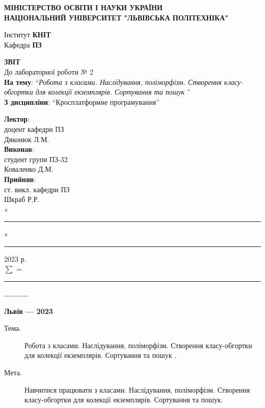 \documentclass[14pt]{extreport}
\newcommand\subject{Кросплатформне програмування}
\newcommand\lecturer{доцент кафедри ПЗ\\Дяконюк Л.М.}
\newcommand\teacher{ст. викл. кафедри ПЗ\\Шкраб Р.Р.}
\newcommand\mygroup{ПЗ-32}
\newcommand\lab{2}
\newcommand\theme{Робота з класами. Наслідування,
	поліморфізм. Створення класу-обгортки для
	колекції екземплярів. Сортування та пошук
}
\newcommand\purpose{Навчитися працювати з класами. Наслідування,
	поліморфізм. Створення класу-обгортки для
	колекції екземплярів. Сортування та пошук}
\begin{document}
\begin{normalsize}
	\begin{titlepage}
		\thispagestyle{empty}
		\begin{center}
			\textbf{МІНІСТЕРСТВО ОСВІТИ І НАУКИ УКРАЇНИ\\
				НАЦІОНАЛЬНИЙ УНІВЕРСИТЕТ "ЛЬВІВСЬКА ПОЛІТЕХНІКА"}
		\end{center}
		\begin{flushright}
			Інститут \textbf{КНІТ}\\
			Кафедра \textbf{ПЗ}
		\end{flushright}
		\vspace{160pt}
		\begin{center}
			\textbf{ЗВІТ}\\
			\vspace{10pt}
			До лабораторної роботи № \lab\\
			\textbf{На тему}: “\textit{\theme}”\\
			\textbf{З дисципліни}: “\subject”
		\end{center}
		\vspace{40pt}
		\begin{flushright}
			
			\textbf{Лектор}:\\
			\lecturer\\
			\vspace{10pt}
			\textbf{Виконав}:\\
			
			студент групи \mygroup\\
			Коваленко Д.М.\\
			\vspace{10pt}
			\textbf{Прийняв}:\\
			
			\teacher\\
			
			\vspace{28pt}
			«\rule{1cm}{0.15mm}» \rule{1.5cm}{0.15mm} 2023 р.\\
			$\sum$ = \rule{1cm}{0.15mm}……………\\
			
		\end{flushright}
		\vspace{\fill}
		\begin{center}
			\textbf{Львів — 2023}
		\end{center}
	\end{titlepage}
		
	\begin{description}
		\item[Тема.] \theme.
		\item[Мета.] \purpose.
	\end{description}
	


\end{normalsize}
\end{document}
